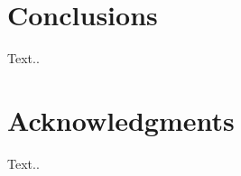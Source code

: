 \documentclass{acm_proc_article-sp}
\begin{document}




\section{Conclusions}
Text..

\section{Acknowledgments}
Text..

%

%
%

\balancecolumns
\end{document}
